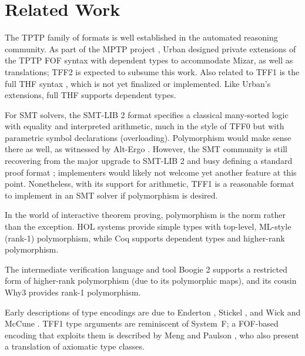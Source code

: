\section{Related Work}
\label{sec_related}

The TPTP family of formats is well established in the automated reasoning
community. As part of the MPTP project \cite{urban-2006}, Urban designed private
extensions of the TPTP FOF syntax with dependent types to
accommodate Mizar, as well as translations; TFF2 is expected to subsume this work. Also
related to TFF1 is the full THF syntax \cite{sutcliffe-benzmueller-2010}, which
is not yet finalized or implemented. Like Urban's extensions, full THF supports
dependent types.

For SMT solvers, the SMT-LIB 2 format \cite{barrett-et-al-2010} specifies a
classical many-sorted logic with equality and interpreted arithmetic, much in
the style of TFF0 but with parametric symbol declarations (overloading).
Polymorphism would make sense there as well, as witnessed by Alt-Ergo
\cite{bobot-et-al-2008}.
However, the SMT community is still recovering from the major
upgrade to SMT-LIB 2 and busy defining a standard proof format
\cite{besson-et-al-2011}; implementers would likely not welcome yet another
feature at this point. Nonetheless, with its support for arithmetic, TFF1 is a
reasonable format to implement in an SMT solver if polymorphism is desired.

In the world of interactive theorem proving, polymorphism is the norm rather
than the exception. HOL systems \cite{gordon-melham-1993} provide simple types
with top-level, ML-style (rank-1) polymorphism, while Coq
\cite{bertot-casteran-2004} supports dependent types and higher-rank
polymorphism.

The intermediate verification language and tool Boogie 2 \cite{leino-ruemmer-2010}
supports a restricted form of higher-rank polymorphism (due to its polymorphic maps),
and its cousin Why3 \cite{bobot-et-al-2011}
provides rank-1 polymorphism.%

Early descriptions of type encodings are due to Enderton
\cite[\S4.3]{enderton-1972}, Stickel \cite[p.~99]{stickel-1986}, and Wick and
McCune \cite[\S4]{wick-mccune-1989}. TFF1 type arguments are reminiscent of
System~F; a FOF-based encoding that exploits them is described by Meng and
Paulson \cite{meng-paulson-2008-trans}, who also present a translation of
axiomatic type classes.

